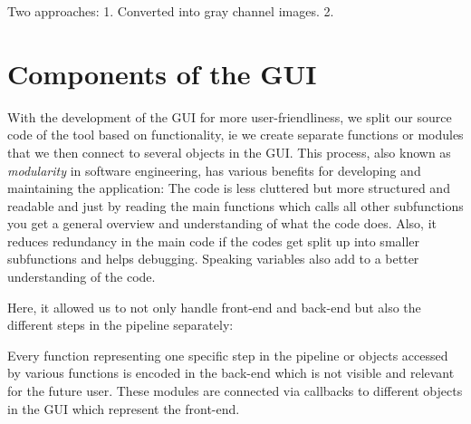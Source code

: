 Two approaches:
1.
Converted into gray channel images.
2.




\section{Components of the GUI}

With the development of the GUI for more user-friendliness, we split our source code of the tool based on functionality, ie we create separate functions or modules that we then connect to several objects in the GUI. This process, also known as \textit{modularity} in software engineering, has various benefits for developing and maintaining the application: The code is less cluttered but more structured and readable and just by reading the main functions which calls all other subfunctions you get a general overview and understanding of what the code does. Also, it reduces redundancy in the main code if the codes get split up into smaller subfunctions and helps debugging. Speaking variables also add to a better understanding of the code.



Here, it allowed us to not only handle front-end and back-end but also the different steps in the pipeline separately: 

Every function representing one specific step in the pipeline or objects accessed by various functions is encoded in the back-end which is not visible and relevant for the future user. These modules are connected via callbacks to different objects in the GUI which represent the front-end.


